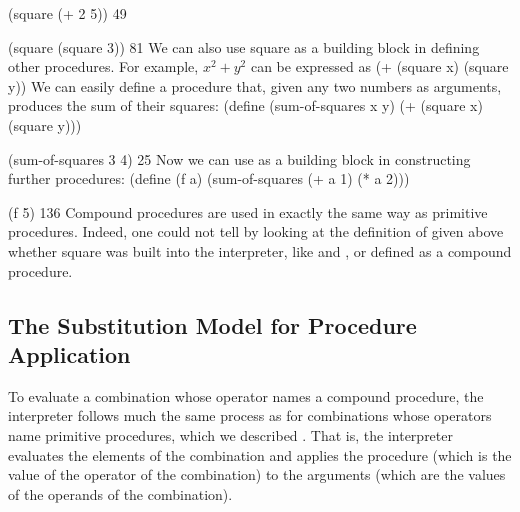 (square (+ 2 5))
49

(square (square 3))
81
\stopcode
We can also use square as a building block in defining other procedures.
For example, $x^2 + y^2$ can be expressed as
\startcode
(+ (square x) (square y))
\stopcode
We can easily define a procedure  that,
given any two numbers as arguments, produces the sum of their squares:
\startcode
(define (sum-of-squares x y)
  (+ (square x) (square y)))

(sum-of-squares 3 4)
25
\stopcode
Now we can use  as a building block in constructing further procedures:
\startcode
(define (f a)
  (sum-of-squares (+ a 1) (* a 2)))

(f 5)
136
\stopcode
Compound procedures are used in exactly the same way as primitive procedures.
Indeed,
one could not tell
by looking at the definition of  given above
whether square was built into the interpreter,
like \exp{+} and \exp{*}, or defined as a compound procedure.

\subsection{The Substitution Model for Procedure Application}

To evaluate a combination whose operator names a compound procedure,
the interpreter follows much the same process as for combinations
whose operators name primitive procedures, which we described .
That is,
the interpreter evaluates the elements of the combination and applies the procedure
(which is the value of the operator of the combination)
to the arguments
(which are the values of the operands of the combination).

